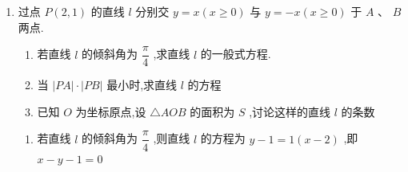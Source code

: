 \begin{enumerate}
\begin{jieda}
\begin{enumerate}
            因此有 $\left\{  \begin{array}{l} m + {2n} - 4 = 7 \\  {2m} - {3n} + 6 = 0 \end{array}\right.$ 或 $\left\{  \begin{array}{l} m + {2n} - 4 =  - 7 \\  {2m} - {3n} + 6 = 0 \end{array}\right.$ ,解得： $\left\{  \begin{array}{l} m = 3 \\  n = 4 \end{array}\right.$ 或 $\left\{  \begin{array}{l} m =  - 3 \\  n = 0 \end{array}\right.$，所以点 $A$ 的坐标为:$(3,4)$或$(-3,0)$.
        \end{enumerate}
    \end{jieda}

    
    \item 过点 $P\left( {2,1}\right)$ 的直线 $l$ 分别交 $y = x\left( {x \geq  0}\right)$ 与 $y =  - x\left( {x \geq  0}\right)$ 于 $A\text{ 、 }B$ 两点.
    \begin{enumerate}
        \item 若直线 $l$ 的倾斜角为 $\dfrac{\pi }{4}$ ,求直线 $l$ 的一般式方程.
        \item 当 $\left| {PA}\right|  \cdot  \left| {PB}\right|$ 最小时,求直线 $l$ 的方程
        \item 已知 $O$ 为坐标原点,设 $\triangle{AOB}$ 的面积为 ${S}$ ,讨论这样的直线 $l$ 的条数
    \end{enumerate}
    \begin{jieda}
        \begin{enumerate}
            \item 若直线 $l$ 的倾斜角为 $\dfrac{\pi }{4}$ ,则直线 $l$ 的方程为 $y - 1 = 1\left( {x - 2}\right)$ ,即 $x - y - 1 = 0$ 
            

\end{enumerate}
\end{jieda}
\end{enumerate}
